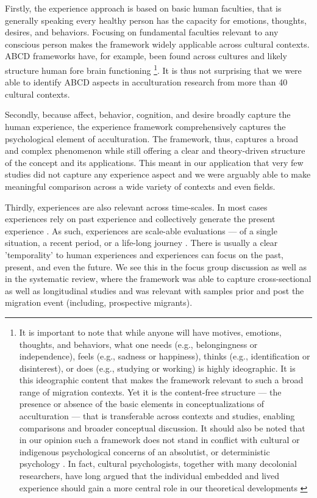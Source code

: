 \documentclass[man, 12pt, a4paper]{apa7}
\begin{document}
Firstly, the experience approach is based on basic human faculties, that is generally speaking every healthy person has the capacity for emotions, thoughts, desires, and behaviors. Focusing on fundamental faculties relevant to any conscious person makes the framework widely applicable across cultural contexts. ABCD frameworks have, for example, been found across cultures \citep[e.g.,][]{Bhawuk2011} and likely structure human fore brain functioning \citep{Swanson2020}\footnote{It is important to note that while anyone will have motives, emotions, thoughts, and behaviors, what one needs (e.g., belongingness or independence), feels (e.g., sadness or happiness), thinks (e.g., identification or disinterest), or does (e.g., studying or working) is highly ideographic. It is this ideographic content that makes the framework relevant to such a broad range of migration contexts. Yet it is the content-free structure --- the presence or absence of the basic elements in conceptualizations of acculturation --- that is transferable across contexts and studies, enabling comparisons and broader conceptual discussion. It should also be noted that in our opinion such a framework does not stand in conflict with cultural or indigenous psychological concerns of an absolutist, or deterministic psychology \citep[e.g.,][]{Kim2006a}. In fact, cultural psychologists, together with many decolonial researchers, have long argued that the individual embedded and lived experience should gain a more central role in our theoretical developments \citep[e.g., ontological turn;][]{Pedersen2020}}. It is thus not surprising that we were able to identify ABCD aspects in acculturation research from more than 40 cultural contexts.

Secondly, because affect, behavior, cognition, and desire broadly capture the human experience, the experience framework comprehensively captures the psychological element of acculturation. The framework, thus, captures a broad and complex phenomenon while still offering a clear and theory-driven structure of the concept and its applications. This meant in our application that very few studies did not capture any experience aspect and we were arguably able to make meaningful comparison across a wide variety of contexts and even fields.

Thirdly, experiences are also relevant across time-scales. In most cases experiences rely on past experience and collectively generate the present experience \citep[also see][]{Husserl1959, Heidegger1867}. As such, experiences are scale-able evaluations --- of a single situation, a recent period, or a life-long journey \citep[e.g.,][]{Clewett2019}. There is usually a clear 'temporality' to human experiences and experiences can focus on the past, present, and even the future. We see this in the focus group discussion as well as in the systematic review, where the framework was able to capture cross-sectional as well as longitudinal studies and was relevant with samples prior and post the migration event (including, prospective migrants). 
\end{document}
